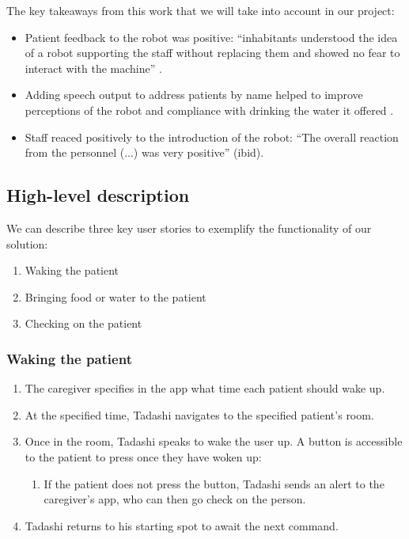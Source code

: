 \documentclass{article}
\begin{document}
The key takeaways from this work that we will take into account in our project:
\begin{itemize}
\item Patient feedback to the robot was positive: ``inhabitants  understood  the  idea  of  a  robot  supporting  the  staff  without replacing them and showed no fear to interact with the machine'' \cite{springer}. 
\item Adding speech output to address patients by name helped to improve perceptions of the robot and compliance with drinking the water it offered \cite{ieee}. 
\item Staff reaced positively to the introduction of the robot: ``The overall reaction from the personnel (...) was very positive'' (ibid). 
\end{itemize}

\subsection{High-level description} 
We can describe three key user stories to exemplify the functionality of our solution:
\begin{enumerate}
\item Waking the patient
\item Bringing food or water to the patient
\item Checking on the patient
\end{enumerate}

\subsubsection{Waking the patient}
\begin{enumerate}
\item The caregiver specifies in the app what time each patient should wake up.
\item At the specified time, Tadashi navigates to the specified patient's room.
\item Once in the room, Tadashi speaks to wake the user up. A button is accessible to the patient to press once they have woken up:
  \begin{enumerate} 
  \item If the patient does not press the button, Tadashi sends an alert to the caregiver's app, who can then go check on the person. 
  \end{enumerate}
\item Tadashi returns to his starting spot to await the next command. 
\end{enumerate}
\end{document}
